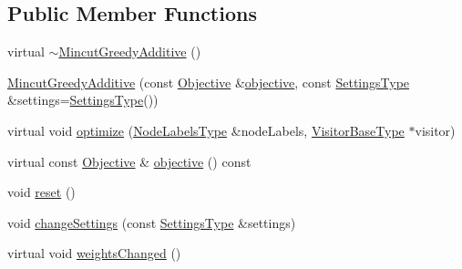 \subsection*{Public Member Functions}
\begin{DoxyCompactItemize}
\item 
virtual \hyperlink{classnifty_1_1graph_1_1optimization_1_1mincut_1_1MincutGreedyAdditive_a30aedef787bf011fa0081d989ab727b3}{$\sim$\+Mincut\+Greedy\+Additive} ()
\item 
\hyperlink{classnifty_1_1graph_1_1optimization_1_1mincut_1_1MincutGreedyAdditive_afa2dc270d336eef85a8a317887b69660}{Mincut\+Greedy\+Additive} (const \hyperlink{classnifty_1_1graph_1_1optimization_1_1mincut_1_1MincutGreedyAdditive_a231a53c994cb17fbcd60cb2bcc4152f3}{Objective} \&\hyperlink{classnifty_1_1graph_1_1optimization_1_1mincut_1_1MincutGreedyAdditive_ac87eacfc26323880af9e12501e4afafd}{objective}, const \hyperlink{classnifty_1_1graph_1_1optimization_1_1mincut_1_1MincutGreedyAdditive_a9b4deedbecb1729cb833e9913b5e01a0}{Settings\+Type} \&settings=\hyperlink{classnifty_1_1graph_1_1optimization_1_1mincut_1_1MincutGreedyAdditive_a9b4deedbecb1729cb833e9913b5e01a0}{Settings\+Type}())
\item 
virtual void \hyperlink{classnifty_1_1graph_1_1optimization_1_1mincut_1_1MincutGreedyAdditive_a945c034e4f448515771418858d787112}{optimize} (\hyperlink{classnifty_1_1graph_1_1optimization_1_1mincut_1_1MincutGreedyAdditive_a693f650b319d1fe1c9ce2cc256f4c7d7}{Node\+Labels\+Type} \&node\+Labels, \hyperlink{classnifty_1_1graph_1_1optimization_1_1mincut_1_1MincutGreedyAdditive_adb1c1472355ffa684b427eb817f383a5}{Visitor\+Base\+Type} $\ast$visitor)
\item 
virtual const \hyperlink{classnifty_1_1graph_1_1optimization_1_1mincut_1_1MincutGreedyAdditive_a231a53c994cb17fbcd60cb2bcc4152f3}{Objective} \& \hyperlink{classnifty_1_1graph_1_1optimization_1_1mincut_1_1MincutGreedyAdditive_ac87eacfc26323880af9e12501e4afafd}{objective} () const 
\item 
void \hyperlink{classnifty_1_1graph_1_1optimization_1_1mincut_1_1MincutGreedyAdditive_a330c4cd5803305c23b39e82fff5ef35e}{reset} ()
\item 
void \hyperlink{classnifty_1_1graph_1_1optimization_1_1mincut_1_1MincutGreedyAdditive_a43d1b66c6f66635093e48a725f3ac019}{change\+Settings} (const \hyperlink{classnifty_1_1graph_1_1optimization_1_1mincut_1_1MincutGreedyAdditive_a9b4deedbecb1729cb833e9913b5e01a0}{Settings\+Type} \&settings)
\item 
virtual void \hyperlink{classnifty_1_1graph_1_1optimization_1_1mincut_1_1MincutGreedyAdditive_ab8ee8cdceb3b1122904a93f250ded1a3}{weights\+Changed} ()

\end{DoxyCompactItemize}
